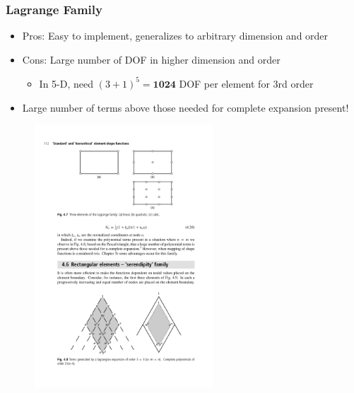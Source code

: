 \documentclass[serif,12pt]{beamer}
\begin{document}
\begin{frame}
\frametitle{Lagrange Family}
	\begin{itemize}
		\item Pros: Easy to implement, generalizes to arbitrary dimension and order
		\item Cons: Large number of DOF in higher dimension and order
		\begin{itemize}
			\item In 5-D, need $(3+1)^5=\mathbf{1024}$ DOF per element for 3rd order
		\end{itemize}
		\item Large number of terms above those needed for complete expansion present!
	\end{itemize}
	\begin{figure}
	    \includegraphics[width=0.6\textwidth]{figures/bookFig3.pdf}
	    \let\thefootnote\relax{}
	\end{figure}
\end{frame}
\end{document}
